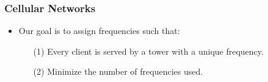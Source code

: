 \documentclass[xcolor=dvipsnames,aspectratio=1610]{beamer}
\begin{document}
  \begin{frame}
    \frametitle{Cellular Networks}



    \pause
    \pause

    \begin{itemize}
      \item Our goal is to assign frequencies such that:
      \pause
      \begin{itemize}
        \item[(1)] Every client is served by a tower with a unique frequency.
        \pause
        \item[(2)] Minimize the number of frequencies used.
      \end{itemize}
    \end{itemize}

  \end{frame}
\end{document}
